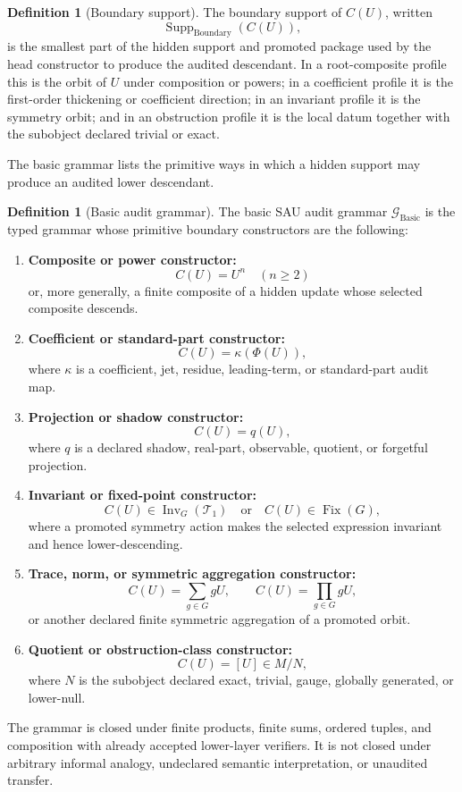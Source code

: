 \documentclass[11pt]{article}
\newcommand{\Fix}{\operatorname{Fix}}
\newcommand{\Supp}{\operatorname{Supp}}
\newcommand{\Boundary}{\operatorname{Boundary}}
\newcommand{\Basic}{\operatorname{Basic}}
\newcommand{\Inv}{\operatorname{Inv}}
\theoremstyle{definition}
\newtheorem{definition}[theorem]{Definition}
\begin{document}
\begin{definition}[Boundary support]
\label{def:sau-boundary-support}
The boundary support of \(C(U)\), written
\[
\Supp_{\Boundary}(C(U)),
\]
is the smallest part of the hidden support and promoted package used by the head constructor to produce the audited descendant.  In a root-composite profile this is the orbit of \(U\) under composition or powers; in a coefficient profile it is the first-order thickening or coefficient direction; in an invariant profile it is the symmetry orbit; and in an obstruction profile it is the local datum together with the subobject declared trivial or exact.
\end{definition}

The basic grammar lists the primitive ways in which a hidden support may produce
an audited lower descendant.

\begin{definition}[Basic audit grammar]
\label{def:sau-basic-audit-grammar}
The basic SAU audit grammar \(\mathcal G_{\Basic}\) is the typed grammar whose primitive boundary constructors are the following:
\begin{enumerate}
\item \textbf{Composite or power constructor:}
\[
C(U)=U^n\quad(n\ge2)
\]
or, more generally, a finite composite of a hidden update whose selected composite descends.
\item \textbf{Coefficient or standard-part constructor:}
\[
C(U)=\kappa(\Phi(U)),
\]
where \(\kappa\) is a coefficient, jet, residue, leading-term, or standard-part audit map.
\item \textbf{Projection or shadow constructor:}
\[
C(U)=q(U),
\]
where \(q\) is a declared shadow, real-part, observable, quotient, or forgetful projection.
\item \textbf{Invariant or fixed-point constructor:}
\[
C(U)\in \Inv_G(\mathcal T_1)\quad\text{or}\quad C(U)\in \Fix(G),
\]
where a promoted symmetry action makes the selected expression invariant and hence lower-descending.
\item \textbf{Trace, norm, or symmetric aggregation constructor:}
\[
C(U)=\sum_{g\in G}gU,
\qquad
C(U)=\prod_{g\in G}gU,
\]
or another declared finite symmetric aggregation of a promoted orbit.
\item \textbf{Quotient or obstruction-class constructor:}
\[
C(U)=[U]\in M/N,
\]
where \(N\) is the subobject declared exact, trivial, gauge, globally generated, or lower-null.
\end{enumerate}
The grammar is closed under finite products, finite sums, ordered tuples, and composition with already accepted lower-layer verifiers.  It is not closed under arbitrary informal analogy, undeclared semantic interpretation, or unaudited transfer.
\end{definition}
\end{document}
